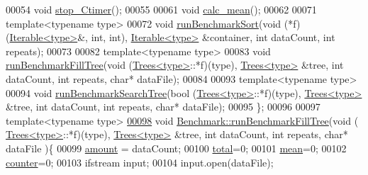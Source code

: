 \begin{DoxyCode}
00054   \textcolor{keywordtype}{void} \hyperlink{class_benchmark_ab65889d4c2df3eb503048ab1cc6e7413}{stop\_Ctimer}();
00055 
00061   \textcolor{keywordtype}{void} \hyperlink{class_benchmark_ac4d5360d2850510913efe07cf957f4c1}{calc\_mean}();
00062 
00071   \textcolor{keyword}{template}<\textcolor{keyword}{typename} type>
00072   \textcolor{keywordtype}{void} \hyperlink{class_benchmark_ad5d8a563d9b9163758ae04d064cc38cb}{runBenchmarkSort}(\textcolor{keywordtype}{void} (*f)(\hyperlink{class_iterable}{Iterable<type>}&, \textcolor{keywordtype}{int}, \textcolor{keywordtype}{int}), 
      \hyperlink{class_iterable}{Iterable<type>} &container, \textcolor{keywordtype}{int} dataCount, \textcolor{keywordtype}{int} repeats);
00073 
00082   \textcolor{keyword}{template}<\textcolor{keyword}{typename} type>
00083   \textcolor{keywordtype}{void} \hyperlink{class_benchmark_ac0795fc9eae36d523dde2fe06ea10fc0}{runBenchmarkFillTree}(\textcolor{keywordtype}{void} (\hyperlink{class_trees}{Trees<type>}::*f)(type), 
      \hyperlink{class_trees}{Trees<type>} &tree, \textcolor{keywordtype}{int} dataCount, \textcolor{keywordtype}{int} repeats, \textcolor{keywordtype}{char}* dataFile);
00084 
00093   \textcolor{keyword}{template}<\textcolor{keyword}{typename} type>
00094   \textcolor{keywordtype}{void} \hyperlink{class_benchmark_a9e6b5ef8df351452be5fa0c8d127367a}{runBenchmarkSearchTree}(\textcolor{keywordtype}{bool} (\hyperlink{class_trees}{Trees<type>}::*f)(type), 
      \hyperlink{class_trees}{Trees<type>} &tree, \textcolor{keywordtype}{int} dataCount, \textcolor{keywordtype}{int} repeats, \textcolor{keywordtype}{char}* dataFile);
00095 \};
00096 
00097 \textcolor{keyword}{template}<\textcolor{keyword}{typename} type>
\hypertarget{benchmark_8hh_source_l00098}{}\hyperlink{class_benchmark_ac0795fc9eae36d523dde2fe06ea10fc0}{00098} \textcolor{keywordtype}{void} \hyperlink{class_benchmark_ac0795fc9eae36d523dde2fe06ea10fc0}{Benchmark::runBenchmarkFillTree}(\textcolor{keywordtype}{void} (
      \hyperlink{class_trees}{Trees<type>}::*f)(type), \hyperlink{class_trees}{Trees<type>} &tree, \textcolor{keywordtype}{int} dataCount, \textcolor{keywordtype}{int} repeats, \textcolor{keywordtype}{char}* dataFile
      )\{
00099   \hyperlink{class_benchmark_a1d0eaa6febe9b7a7f5f5147e83f60910}{amount} = dataCount;
00100   \hyperlink{class_benchmark_a7130c0718e3a3ab2fea70285dab122a2}{total}=0; 
00101   \hyperlink{class_benchmark_aa88092b6164ad7d1243162d3012f729a}{mean}=0;
00102   \hyperlink{class_benchmark_a3a56c7dad0b21e490f3024d5d0027f31}{counter}=0;
00103   ifstream input;
00104   input.open(dataFile);

\end{DoxyCode}
